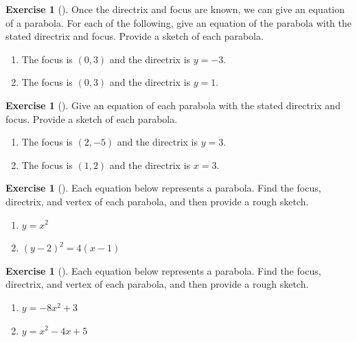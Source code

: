\documentclass[10pt,]{book}
\theoremstyle{plain}
\theoremstyle{definition}
\theoremstyle{definition}
\theoremstyle{definition}
\theoremstyle{definition}
\newtheorem{exploration}[project]{Exercise}
\theoremstyle{definition}
\numberwithin{equation}{section}
\begin{document}
\begin{exploration}[]\label{exploration-57}
Once the directrix and focus are known, we can give an equation of a parabola. For each of the following, give an equation of the parabola with the stated directrix and focus. Provide a sketch of each parabola.%
\begin{enumerate}[font=\bfseries,label=(\alph*),ref=\alph*]
\item\label{task-93} The focus is \((0,3)\) and the directrix is \(y=-3\).%
\item\label{task-94} The focus is \((0,3)\) and the directrix is \(y=1\).%
\end{enumerate}
\end{exploration}
\begin{exploration}[]\label{exploration-58}
Give an equation of each parabola with the stated directrix and focus. Provide a sketch of each parabola.%
\begin{enumerate}[font=\bfseries,label=(\alph*),ref=\alph*]
\item\label{task-95} The focus is \((2,-5)\) and the directrix is \(y=3\).%
\item\label{task-96} The focus is \((1,2)\) and the directrix is \(x=3\).%
\end{enumerate}
\end{exploration}
\begin{exploration}[]\label{exploration-59}
Each equation below represents a parabola. Find the focus, directrix, and vertex of each parabola, and then provide a rough sketch.%
\begin{enumerate}[font=\bfseries,label=(\alph*),ref=\alph*]
\item\label{task-97} \(y=x^2\)%
\item\label{task-98} \((y-2)^2=4(x-1)\)%
\end{enumerate}
\end{exploration}
\begin{exploration}[]\label{exploration-60}
Each equation below represents a parabola. Find the focus, directrix, and vertex of each parabola, and then provide a rough sketch.%
\begin{enumerate}[font=\bfseries,label=(\alph*),ref=\alph*]
\item\label{task-99} \(y=-8x^2+3\)%
\item\label{task-100} \(y=x^2-4x+5\)%
\end{enumerate}
\end{exploration}
\typeout{************************************************}
\typeout{************************************************}
\end{document}
